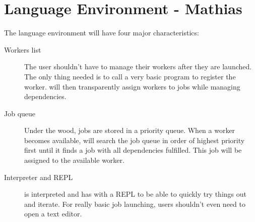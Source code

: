 \section{Language Environment - Mathias}
\label{sect:tech}
The language environment will have four major characteristics:
\begin{description}
\item[Workers list] The user shouldn't have to manage their workers after
they are launched. The only thing needed is to call a very basic program
to register the worker. \lang{} will then transparently assign workers
to jobs while managing dependencies.
\item[Job queue] Under the wood, jobs are stored in a priority queue. When a
worker becomes available, \lang{} will search the job queue in order of highest
priority first until it finds a job with all dependencies fulfilled. This job
will be assigned to the available worker.
\item[Interpreter and REPL] \lang{} is interpreted and has with a REPL to be able to
quickly try things out and iterate. For really basic job launching, users shouldn't
even need to open a text editor.
\end{description}

